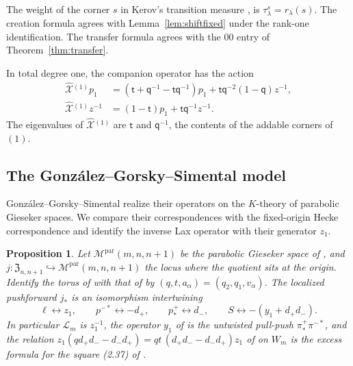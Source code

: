 \documentclass[11pt]{amsart}
\newtheorem{proposition}[theorem]{Proposition}
\theoremstyle{definition}
\theoremstyle{remark}
\newcommand{\Mq}{\mathsf q}                      %
\newcommand{\Mt}{\mathsf t}                      %
\newcommand{\res}[2]{r_{#1}(#2)}                 %
\newcommand{\Zc}{\mathfrak Z}
\newcommand{\Hecke}[1]{\Zc_{#1,#1+1}}            %
\newcommand{\Parab}[3]{\mathcal M^{\mathrm{par}}(#1,#2,#3)}  %
\newcommand{\Wsp}[1]{W_{#1}}                     %
\newcommand{\taut}{\ell}                         %
\newcommand{\pulm}{p^{-*}}                       %
\newcommand{\pushp}{p^+_*}                       %
\newcommand{\pimpull}{\pi^{-*}}                  %
\newcommand{\pippush}{\pi^+_*}                   %
\newcommand{\incl}{j}                            %
\newcommand{\Shift}{S}                           %
\newcommand{\zz}[1]{z_{#1}}
\newcommand{\yy}[1]{y_{#1}}
\newcommand{\zone}{\zz{1}}
\newcommand{\yone}{\yy{1}}
\newcommand{\dplus}{d_+}
\newcommand{\dminus}{d_-}
\newcommand{\GLax}[1]{\mathcal L_{#1}}           %
\newcommand{\Xhat}[1]{\widehat{\mathcal X}{}^{(#1)}}   %
\begin{document}
The weight of the corner \(s\) in Kerov's transition measure \cite{Kerov},
\cite[Definition~3.8]{M26} is \(\tau_\lambda^s=\res{\lambda}{s}\).
The creation formula \cite[Proposition~4.8]{M26} agrees with
Lemma~\ref{lem:shiftfixed} under the rank-one identification.
The transfer formula \cite[Proposition~3.7]{M26} agrees with the
\(00\) entry of Theorem~\ref{thm:transfer}.

In total degree one, the companion operator has the action
\begin{align*}
 \Xhat{1}p_1
 &=(\Mt+\Mq^{-1}-\Mt\Mq^{-1})p_1+\Mt\Mq^{-2}(1-\Mq)z^{-1},\\
 \Xhat{1}z^{-1}
 &=(1-\Mt)p_1+\Mt\Mq^{-1}z^{-1}.
\end{align*}
The eigenvalues of \(\Xhat{1}\) are \(\Mt\) and \(\Mq^{-1}\), the contents of the
addable corners of \((1)\).

\subsection{The Gonz\'alez--Gorsky--Simental model}\label{sec:ggs}

Gonz\'alez--Gorsky--Simental \cite{GGS} realize their operators on the \(K\)-theory
of parabolic Gieseker spaces. We compare their correspondences with the fixed-origin
Hecke correspondence and identify the inverse Lax operator with their generator
\(\zone\).

\begin{proposition}\label{prop:GGS}
Let \(\Parab{m}{n}{n+1}\) be the parabolic Gieseker space of \cite{GGS}, and
\(\incl\colon\Hecke{n}\hookrightarrow\Parab{m}{n}{n+1}\) the locus where the
quotient sits at the origin. Identify the torus of \cite{GGS} with that of
\cite{BCS} by \((q,t,a_\alpha)=(q_2,q_1,v_\alpha)\). The localized
pushforward \(\incl_*\) is an isomorphism intertwining
\[
 \taut\leftrightarrow\zone,\qquad
 \pulm\leftrightarrow-\dplus,\qquad
 \pushp\leftrightarrow\dminus,\qquad
 \Shift\leftrightarrow-(\yone+\dplus\dminus).
\]
In particular \(\GLax{m}\) is \(\zone^{-1}\), the operator \(\yone\) of
\cite{CGM,GGS} is the untwisted pull-push \(\pippush\pimpull\), and the relation
\(\zone(q\dplus\dminus-\dminus\dplus)=qt\,(\dplus\dminus-\dminus\dplus)\zone\)
of \cite{GGS} on \(\Wsp{m}\) is the excess formula for the square
(2.37) of \cite{N2}.
\end{proposition}
\end{document}
